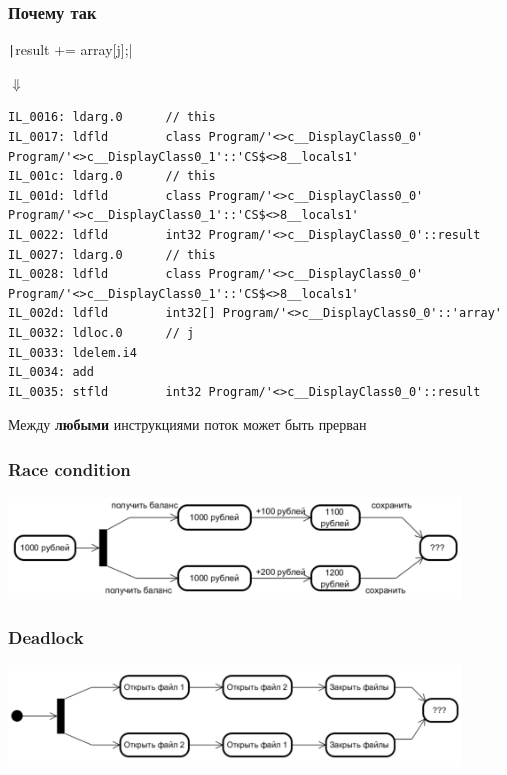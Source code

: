 \documentclass{../../slides-style}
\begin{document}
    \begin{frame}[fragile]
        \frametitle{Почему так}
        \texttt|result += array[j];|

        \hspace{13mm}$\Downarrow$

        \begin{ssmall}
            \begin{verbatim}
IL_0016: ldarg.0      // this
IL_0017: ldfld        class Program/'<>c__DisplayClass0_0' Program/'<>c__DisplayClass0_1'::'CS$<>8__locals1'
IL_001c: ldarg.0      // this
IL_001d: ldfld        class Program/'<>c__DisplayClass0_0' Program/'<>c__DisplayClass0_1'::'CS$<>8__locals1'
IL_0022: ldfld        int32 Program/'<>c__DisplayClass0_0'::result
IL_0027: ldarg.0      // this
IL_0028: ldfld        class Program/'<>c__DisplayClass0_0' Program/'<>c__DisplayClass0_1'::'CS$<>8__locals1'
IL_002d: ldfld        int32[] Program/'<>c__DisplayClass0_0'::'array'
IL_0032: ldloc.0      // j
IL_0033: ldelem.i4    
IL_0034: add          
IL_0035: stfld        int32 Program/'<>c__DisplayClass0_0'::result
            \end{verbatim}
        \end{ssmall}
        \vspace{5mm}
        Между \textbf{любыми} инструкциями поток может быть прерван
    \end{frame}

    \begin{frame}
        \frametitle{Race condition}
        \begin{center}
            \includegraphics[width=0.9\textwidth]{raceCondition.png}
        \end{center}
    \end{frame}

    \begin{frame}
        \frametitle{Deadlock}
        \begin{center}
            \includegraphics[width=0.9\textwidth]{deadlock.png}
        \end{center}
    \end{frame}
    
\end{document}
